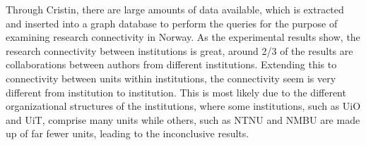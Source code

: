 Through Cristin, there are large amounts of data available, which is extracted and inserted into a graph database to perform the queries for the purpose of examining research connectivity in Norway.
As the experimental results show, the research connectivity between institutions is great, around 2/3 of the results are collaborations between authors from different institutions.
Extending this to connectivity between units within institutions, the connectivity seem is very different from institution to institution.
This is most likely due to the different organizational structures of the institutions, where some institutions, such as UiO and UiT, comprise many units while others, such as NTNU and NMBU are made up of far fewer units, leading to the inconclusive results.
